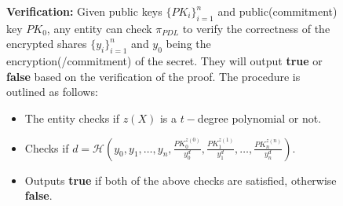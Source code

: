 \begin{figure}[t!]
{\begin{tcolorbox}[title=\textbf{$\Lambda_{RO}$ \cite{cryptoeprint:2025/576}}, width=1.2\textwidth, colframe=blue!75!black, colback=blue!10, sharp corners]
        \vspace{0.5em}
        \textbf{Verification:}
            Given public keys $\{PK_i\}_{i=1}^n$ and public(commitment) key $PK_0$, any entity can check 
            $\pi_{PDL}$ to verify the correctness of the encrypted shares $\{y_i\}_{i=1}^n$ and $y_0$ being the encryption(/commitment) of the secret. 
            They will output \textbf{true} or \textbf{false} based on the verification of the proof. The 
            procedure is outlined as follows:
        \begin{itemize}
            \item The entity checks if $z(X)$ is a $t-$degree polynomial or not.
            \item Checks if $d=\mathcal{H}(y_0,y_1,\dots,y_n,\frac{PK_0^{z(0)}}{y_0^d},\frac{PK_1^{z(1)}}{y_1^d},\dots,\frac{PK_n^{z(n)}}{y_n^d})$.
            \item Outputs \textbf{true} if both of the above checks are satisfied, otherwise \textbf{false}.
        \end{itemize}


\end{tcolorbox}}
\end{figure}
